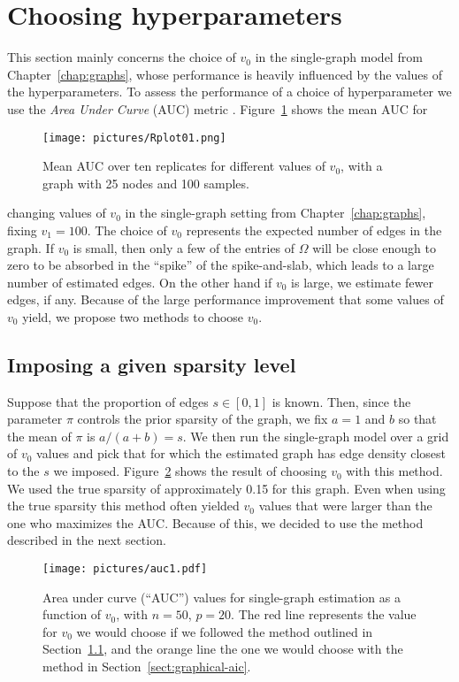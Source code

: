 \documentclass[a4paper, 11pt, oneside]{report}
\newcommand{\1}{\mathds{1}}
\begin{document}
\section{Choosing hyperparameters}\label{sec:hyperparameters}
This section mainly concerns the choice of $v_0$ in the single-graph model from Chapter~\ref{chap:graphs},
whose performance is heavily influenced by the values of the
hyperparameters.
To assess the performance of a choice of hyperparameter we use the \emph{Area Under Curve} (AUC) metric \citep{hastie2009elements}.
Figure~\ref{fig:mean_auc} shows the mean AUC for
\begin{figure}[tb]
	\centering
	\texttt{[image: pictures/Rplot01.png]}
	\caption{Mean AUC over ten replicates for different values of $v_0$, with a
		graph with 25 nodes and 100 samples.}\label{fig:mean_auc}
\end{figure}
changing values of $v_0$ in the single-graph setting from Chapter~\ref{chap:graphs}, fixing $v_1 = 100$.
The choice of $v_0$ represents the expected number of edges in the graph.
If $v_0$ is small, then only a few of the entries of $\Omega$ will be close
enough to zero to be absorbed in the ``spike'' of the spike-and-slab, which
leads to a large number of estimated edges. On the other hand if $v_0$ is
large, we estimate fewer edges, if any.
Because of the large performance improvement that some values of $v_0$ yield,
we propose two methods to choose $v_0$.

\subsection{Imposing a given sparsity level}\label{sect:imposing-sparsity}
Suppose that the proportion of edges $s \in [0,1]$ is known.
Then, since the parameter $\pi$ controls the prior sparsity of the graph, we
fix $a = 1$ and $b$ so that the mean of $\pi$ is $a / (a+b) = s$.
We then run the single-graph model over a grid of $v_0$ values and pick that
for which the estimated graph has edge density closest to the $s$ we imposed.
Figure~\ref{fig:auc} shows the result of choosing $v_0$ with this method.
We used the true sparsity of approximately 0.15 for this graph.
Even when using the true sparsity this method often yielded $v_0$ values
that were larger than the one who maximizes the AUC.\@
Because of this, we decided to use the method described in the next section.
\begin{figure}[tb]
	\begin{center}
		\texttt{[image: pictures/auc1.pdf]}
	\end{center}
	\caption{Area under curve (``AUC'') values for single-graph estimation as a function of $v_0$, with $n=50$, $p=20$.
		The red line represents the value for $v_0$ we would choose if we followed the method outlined in Section~\ref{sect:imposing-sparsity},
		and the orange line the one we would choose with the method in Section~\ref{sect:graphical-aic}.}
	\label{fig:auc}
\end{figure}
\end{document}
